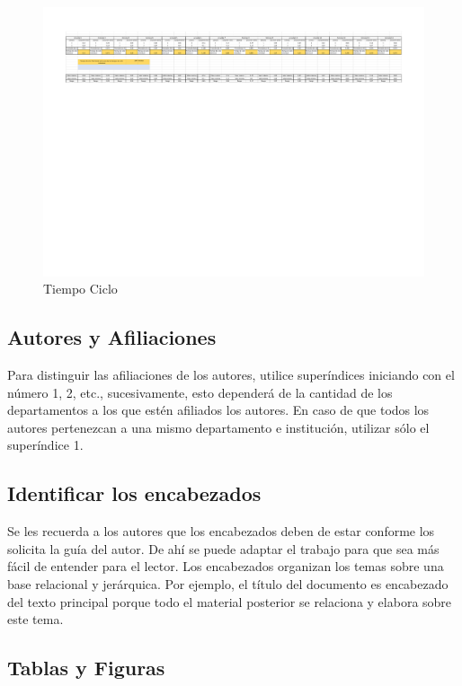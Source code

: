     \begin{figure}[H]
        \centering
        \includegraphics[trim = {0mm 0mm 0mm 0mm},clip,scale=0.3
        ]{20/img/Tiempo Ciclo Ensamble - Hoja 1.pdf}
        \caption{Tiempo Ciclo}
        \end{figure}
    
    \subsection{Autores y Afiliaciones}
    
    Para distinguir las afiliaciones de los autores, utilice superíndices iniciando con el número 1, 2, etc., sucesivamente, esto dependerá de la cantidad de los departamentos a los que estén afiliados los autores. En caso de que todos los autores pertenezcan a una mismo departamento e institución, utilizar sólo el superíndice 1. 
    
    \subsection{Identificar los encabezados}
    
    Se les recuerda a los autores que los encabezados deben de estar conforme los solicita la guía del autor. De ahí se puede adaptar el trabajo para que sea más fácil de entender para el lector.
    Los encabezados organizan los temas sobre una base relacional y jerárquica. Por ejemplo, el título del documento es encabezado del texto principal porque todo el material posterior se relaciona y elabora sobre este tema. 
    
    \subsection{Tablas y Figuras}
    
